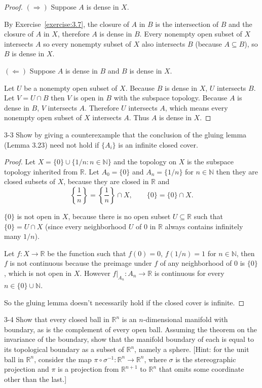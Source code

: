\begin{proof}
	$(\Rightarrow)$ Suppose $A$ is dense in $X$.

	By Exercise~\ref{exercise:3.7}, the closure of $A$ in $B$ is the intersection of $B$ and the closure of $A$ in $X$, therefore $A$ is dense in $B$. Every nonempty open subset of $X$ intersects $A$ so every nonempty subset of $X$ also intersects $B$ (because $A\subseteq B$), so $B$ is dense in $X$.

	$(\Leftarrow)$ Suppose $A$ is dense in $B$ and $B$ is dense in $X$.

	Let $U$ be a nonempty open subset of $X$. Because $B$ is dense in $X$, $U$ intersects $B$. Let $V = U\cap B$ then $V$ is open in $B$ with the subspace topology. Because $A$ is dense in $B$, $V$ intersects $A$. Therefore $U$ intersects $A$, which means every nonempty open subset of $X$ intersects $A$. Thus $A$ is dense in $X$.
\end{proof}

\begin{problem}{3-3}
Show by giving a counterexample that the conclusion of the gluing lemma (Lemma 3.23) need not hold if $\{ A_{i} \}$ is an infinite closed cover.
\end{problem}

\begin{proof}
	Let $X = \{ 0 \} \cup \{ 1/n : n\in\mathbb{N} \}$ and the topology on $X$ is the subspace topology inherited from $\mathbb{R}$. Let $A_{0} = \{ 0 \}$ and $A_{n} = \{ 1/n \}$ for $n\in\mathbb{N}$ then they are closed subsets of $X$, because they are closed in $\mathbb{R}$ and
	\[
		\left\{ \frac{1}{n} \right\} = \left\{\frac{1}{n}\right\} \cap X,\qquad \{ 0 \} = \{ 0 \} \cap X.
	\]

	$\{ 0 \}$ is not open in $X$, because there is no open subset $U\subseteq\mathbb{R}$ such that $\{ 0 \} = U\cap X$ (since every neighborhood $U$ of $0$ in $\mathbb{R}$ always contains infinitely many $1/n$).

	Let $f: X\to \mathbb{R}$ be the function such that $f(0) = 0$, $f(1/n) = 1$ for $n\in\mathbb{N}$, then $f$ is not continuous because the preimage under $f$ of any neighborhood of $0$ is $\{ 0 \}$, which is not open in $X$. However $f\vert_{A_{n}}: A_{n}\to \mathbb{R}$ is continuous for every $n\in \{ 0 \}\cup\mathbb{N}$.

	So the gluing lemma doesn't necessarily hold if the closed cover is infinite.
\end{proof}

\begin{problem}{3-4}
Show that every closed ball in $\mathbb{R}^{n}$ is an $n$-dimensional manifold with boundary, as is the complement of every open ball. Assuming the theorem on the invariance of the boundary, show that the manifold boundary of each is equal to its topological boundary as a subset of $\mathbb{R}^{n}$, namely a sphere. [Hint: for the unit ball in $\mathbb{R}^{n}$, consider the map $\pi\circ\sigma^{-1}: \mathbb{R}^{n}\to\mathbb{R}^{n}$, where $\sigma$ is the stereographic projection and $\pi$ is a projection from $\mathbb{R}^{n+1}$ to $\mathbb{R}^{n}$ that omits some coordinate other than the last.]
\end{problem}

